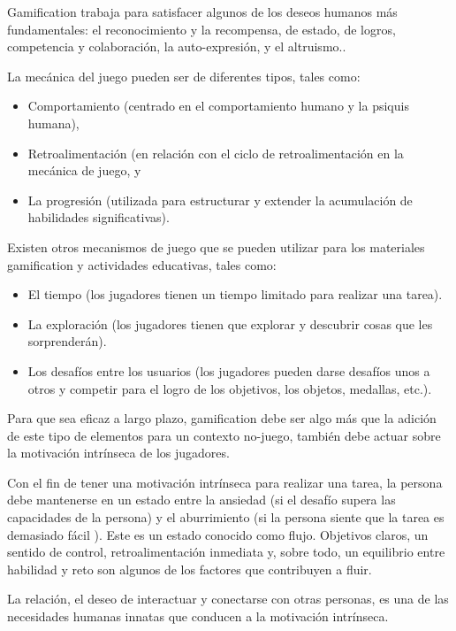 Gamification trabaja para satisfacer algunos de los deseos humanos más fundamentales: el reconocimiento y la recompensa, de estado, de logros, competencia y colaboración, la auto-expresión, y el altruismo.\cite{breaking:gamification}.

La mecánica del juego pueden ser de diferentes tipos\cite{breaking:gamification}, tales como:

\begin{itemize}
	\item Comportamiento (centrado en el comportamiento humano y la psiquis humana),
	\item Retroalimentación (en relación con el ciclo de retroalimentación en la mecánica de juego, y
	\item La progresión (utilizada para estructurar y extender la acumulación de habilidades significativas).
\end{itemize}


Existen otros mecanismos de juego que se pueden utilizar para los materiales gamification y actividades educativas\cite{breaking:gamification}, tales como:

\begin{itemize}
	\item El tiempo (los jugadores tienen un tiempo limitado para realizar una tarea).
	\item La exploración (los jugadores tienen que explorar y descubrir cosas que les sorprenderán).
	\item Los desafíos entre los usuarios (los jugadores pueden darse desafíos unos a otros y competir para el logro de los objetivos, los objetos, medallas, etc.).
\end{itemize}

Para que sea eficaz a largo plazo, gamification debe ser algo más que la adición de este tipo de elementos para un contexto no-juego, también debe actuar sobre la motivación intrínseca de los jugadores\cite{framework:gamification}. 

Con el fin de tener una motivación intrínseca para realizar una tarea, la persona debe mantenerse en un estado entre la ansiedad (si el desafío supera las capacidades de la persona) y el aburrimiento (si la persona siente que la tarea es demasiado fácil ). Este es un estado conocido como flujo. Objetivos claros, un sentido de control, retroalimentación inmediata y, sobre todo, un equilibrio entre habilidad y reto son algunos de los factores que contribuyen a fluir\cite{framework:gamification}.

La relación, el deseo de interactuar y conectarse con otras personas, es una de las necesidades humanas innatas que conducen a la motivación intrínseca\cite{framework:gamification}.

